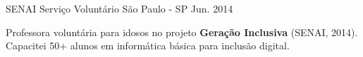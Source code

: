 

\begin{cventries}

  \cventry
    {SENAI} %
    {Serviço Voluntário} %
    {São Paulo - SP} %
    {Jun. 2014} %
    {
      \begin{cvitems} %
        \item {Professora voluntária para idosos no projeto \textbf{Geração Inclusiva} (SENAI, 2014). Capacitei 50+ alunos em informática básica para inclusão digital.}
      \end{cvitems}
    }

\end{cventries}
